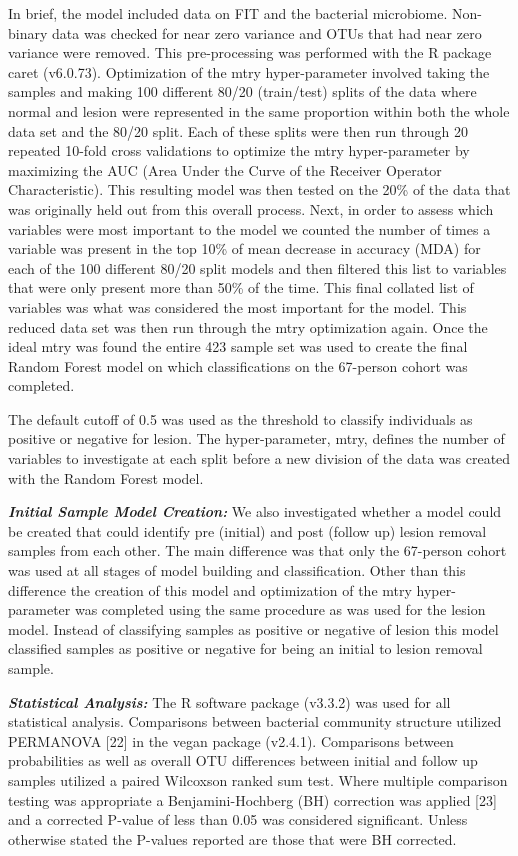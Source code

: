\documentclass[12pt,]{article}
\begin{document}
In brief, the model included data on FIT and the bacterial microbiome.
Non-binary data was checked for near zero variance and OTUs that had
near zero variance were removed. This pre-processing was performed with
the R package caret (v6.0.73). Optimization of the mtry hyper-parameter
involved taking the samples and making 100 different 80/20 (train/test)
splits of the data where normal and lesion were represented in the same
proportion within both the whole data set and the 80/20 split. Each of
these splits were then run through 20 repeated 10-fold cross validations
to optimize the mtry hyper-parameter by maximizing the AUC (Area Under
the Curve of the Receiver Operator Characteristic). This resulting model
was then tested on the 20\% of the data that was originally held out
from this overall process. Next, in order to assess which variables were
most important to the model we counted the number of times a variable
was present in the top 10\% of mean decrease in accuracy (MDA) for each
of the 100 different 80/20 split models and then filtered this list to
variables that were only present more than 50\% of the time. This final
collated list of variables was what was considered the most important
for the model. This reduced data set was then run through the mtry
optimization again. Once the ideal mtry was found the entire 423 sample
set was used to create the final Random Forest model on which
classifications on the 67-person cohort was completed.

The default cutoff of 0.5 was used as the threshold to classify
individuals as positive or negative for lesion. The hyper-parameter,
mtry, defines the number of variables to investigate at each split
before a new division of the data was created with the Random Forest
model.

\textbf{\emph{Initial Sample Model Creation:}} We also investigated
whether a model could be created that could identify pre (initial) and
post (follow up) lesion removal samples from each other. The main
difference was that only the 67-person cohort was used at all stages of
model building and classification. Other than this difference the
creation of this model and optimization of the mtry hyper-parameter was
completed using the same procedure as was used for the lesion model.
Instead of classifying samples as positive or negative of lesion this
model classified samples as positive or negative for being an initial to
lesion removal sample.

\textbf{\emph{Statistical Analysis:}} The R software package (v3.3.2)
was used for all statistical analysis. Comparisons between bacterial
community structure utilized PERMANOVA {[}22{]} in the vegan package
(v2.4.1). Comparisons between probabilities as well as overall OTU
differences between initial and follow up samples utilized a paired
Wilcoxson ranked sum test. Where multiple comparison testing was
appropriate a Benjamini-Hochberg (BH) correction was applied {[}23{]}
and a corrected P-value of less than 0.05 was considered significant.
Unless otherwise stated the P-values reported are those that were BH
corrected.
\end{document}
